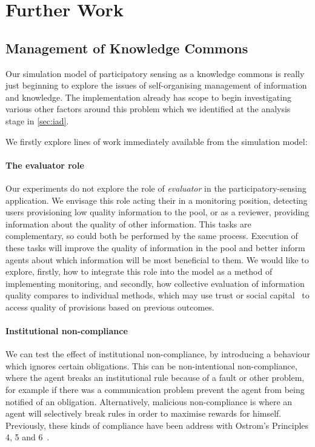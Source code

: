 \section{Further Work}

\subsection{Management of Knowledge Commons}

Our simulation model of participatory sensing as a knowledge commons is really
just beginning to explore the issues of self-organising management of
information and knowledge. The implementation already has scope to begin
investigating various other factors around this problem which we identified at
the analysis stage in \autoref{sec:iad}.

We firstly explore lines of work immediately available from the simulation model:

\paragraph{The evaluator role} Our experiments do not explore the role of
\emph{evaluator} in the participatory-sensing application. We envisage this
role acting their in a monitoring position, detecting users provisioning low
quality information to the pool, or as a reviewer, providing information about
the quality of other information. This tasks are complementary, so could both
be performed by the same process. Execution of these tasks will improve the
quality of information in the pool and better inform agents about which
information will be most beneficial to them. We would like to explore,
firstly, how to integrate this role into the model as a method of implementing
monitoring, and secondly, how collective evaluation of information quality
compares to individual methods, which may use trust or social
capital~\citep{Petruzzi2014} to access quality of provisions based on previous
outcomes.

\paragraph{Institutional non-compliance} We can test the effect of
institutional non-compliance, by introducing a behaviour which ignores certain
obligations. This can be non-intentional non-compliance, where the agent
breaks an institutional rule because of a fault or other problem, for example
if there was a communication problem prevent the agent from being notified of
an obligation. Alternatively, malicious non-compliance is where an agent will
selectively break rules in order to maximise rewards for himself. Previously,
these kinds of compliance have been address with Ostrom's Principles 4, 5 and
6~\citep{Pitt2012b}.  

